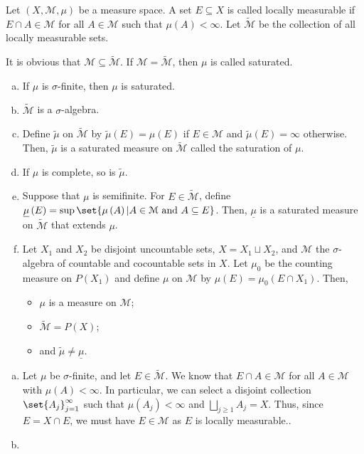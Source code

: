 \documentclass[10pt]{mypackage}
\begin{document}
\begin{exercise}
  Let $\left(X,\mathcal{M},\mu\right)$ be a measure space. A set $E\subseteq X$ is called locally measurable if $E\cap A \in \mathcal{M}$ for all $A\in \mathcal{M}$ such that $\mu\left(A\right) < \infty$. Let $\widetilde{\mathcal{M}}$ be the collection of all locally measurable sets.\newline

  It is obvious that $\mathcal{M}\subseteq \widetilde{\mathcal{M}}$. If $\mathcal{M} = \widetilde{\mathcal{M}}$, then $\mu$ is called saturated.
  \begin{enumerate}[(a)]
    \item If $\mu$ is $\sigma$-finite, then $\mu$ is saturated.
    \item $\widetilde{\mathcal{M}}$ is a $\sigma$-algebra.
    \item Define $\widetilde{\mu}$ on $\widetilde{\mathcal{M}}$ by $ \widetilde{\mu}\left(E\right) = \mu\left(E\right) $ if $E\in \mathcal{M}$ and $ \widetilde{\mu}\left(E\right) = \infty $ otherwise. Then, $\widetilde{\mu}$ is a saturated measure on $\widetilde{\mathcal{M}}$ called the saturation of $\mu$.
    \item If $\mu$ is complete, so is $\widetilde{\mu}$.
    \item Suppose that $\mu$ is semifinite. For $E\in \widetilde{\mathcal{M}}$, define $\underline{\mu}\left(E\right) = \sup\set{\mu\left(A\right) | A\in \mathcal{M}\text{ and }A\subseteq E}$. Then, $\underline{\mu}$ is a saturated measure on $\widetilde{\mathcal{M}}$ that extends $\mu$.
    \item Let $X_1$ and $X_2$ be disjoint uncountable sets, $X = X_1\sqcup X_2$, and $\mathcal{M}$ the $\sigma$-algebra of countable and cocountable sets in $X$. Let $\mu_0$ be the counting measure on $P\left(X_1\right)$ and define $\mu$ on $\mathcal{M}$ by $\mu\left(E\right) = \mu_0\left(E\cap X_1\right)$. Then, 
      \begin{itemize}
        \item $\mu$ is a measure on $\mathcal{M}$;
        \item $\widetilde{\mathcal{M}} = P(X)$;
        \item and $\widetilde{\mu}\neq \underline{\mu}$.
      \end{itemize}
  \end{enumerate}
\end{exercise}
\begin{solution}\hfill
  \begin{enumerate}[(a)]
    \item Let $\mu$ be $\sigma$-finite, and let $E\in \widetilde{\mathcal{M}}$. We know that $E\cap A\in \mathcal{M}$ for all $A\in \mathcal{M}$ with $\mu(A) < \infty$. In particular, we can select a disjoint collection $\set{A_j}_{j=1}^{\infty}$ such that $\mu\left(A_j\right) < \infty$ and $\bigsqcup_{j\geq 1}A_j = X$. Thus, since $E = X\cap E$, we must have $E\in \mathcal{M}$ as $E$ is locally measurable..
    \item 
  \end{enumerate}
\end{solution}
\end{document}
